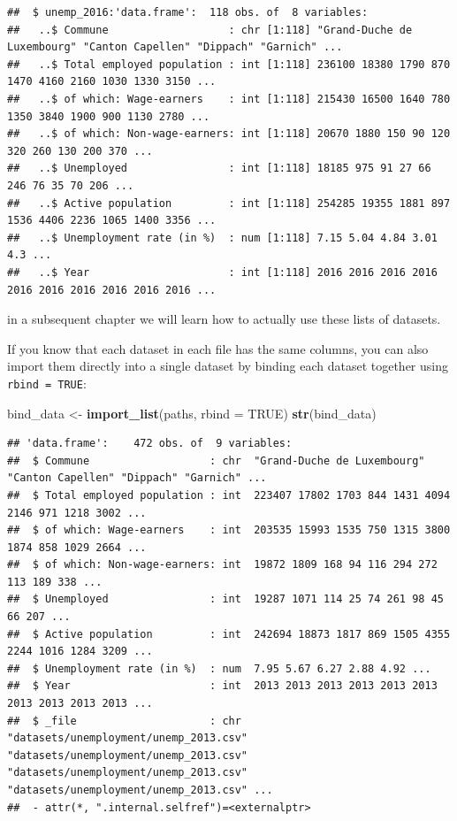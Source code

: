\documentclass[]{gitbook}
\newenvironment{Shaded}{\begin{snugshade}}{\end{snugshade}}
\newcommand{\DataTypeTok}[1]{\textcolor[rgb]{0.13,0.29,0.53}{#1}}
\newcommand{\KeywordTok}[1]{\textcolor[rgb]{0.13,0.29,0.53}{\textbf{#1}}}
\newcommand{\NormalTok}[1]{#1}
\newcommand{\OtherTok}[1]{\textcolor[rgb]{0.56,0.35,0.01}{#1}}
\newcommand{\StringTok}[1]{\textcolor[rgb]{0.31,0.60,0.02}{#1}}
\begin{document}
\begin{verbatim}
##  $ unemp_2016:'data.frame':  118 obs. of  8 variables:
##   ..$ Commune                   : chr [1:118] "Grand-Duche de Luxembourg" "Canton Capellen" "Dippach" "Garnich" ...
##   ..$ Total employed population : int [1:118] 236100 18380 1790 870 1470 4160 2160 1030 1330 3150 ...
##   ..$ of which: Wage-earners    : int [1:118] 215430 16500 1640 780 1350 3840 1900 900 1130 2780 ...
##   ..$ of which: Non-wage-earners: int [1:118] 20670 1880 150 90 120 320 260 130 200 370 ...
##   ..$ Unemployed                : int [1:118] 18185 975 91 27 66 246 76 35 70 206 ...
##   ..$ Active population         : int [1:118] 254285 19355 1881 897 1536 4406 2236 1065 1400 3356 ...
##   ..$ Unemployment rate (in %)  : num [1:118] 7.15 5.04 4.84 3.01 4.3 ...
##   ..$ Year                      : int [1:118] 2016 2016 2016 2016 2016 2016 2016 2016 2016 2016 ...
\end{verbatim}

in a subsequent chapter we will learn how to actually use these lists of datasets.

If you know that each dataset in each file has the same columns, you can also import them directly
into a single dataset by binding each dataset together using \texttt{rbind\ =\ TRUE}:

\begin{Shaded}
\begin{Highlighting}[]
\NormalTok{bind_data <-}\StringTok{ }\KeywordTok{import_list}\NormalTok{(paths, }\DataTypeTok{rbind =} \OtherTok{TRUE}\NormalTok{)}
\KeywordTok{str}\NormalTok{(bind_data)}
\end{Highlighting}
\end{Shaded}

\begin{verbatim}
## 'data.frame':    472 obs. of  9 variables:
##  $ Commune                   : chr  "Grand-Duche de Luxembourg" "Canton Capellen" "Dippach" "Garnich" ...
##  $ Total employed population : int  223407 17802 1703 844 1431 4094 2146 971 1218 3002 ...
##  $ of which: Wage-earners    : int  203535 15993 1535 750 1315 3800 1874 858 1029 2664 ...
##  $ of which: Non-wage-earners: int  19872 1809 168 94 116 294 272 113 189 338 ...
##  $ Unemployed                : int  19287 1071 114 25 74 261 98 45 66 207 ...
##  $ Active population         : int  242694 18873 1817 869 1505 4355 2244 1016 1284 3209 ...
##  $ Unemployment rate (in %)  : num  7.95 5.67 6.27 2.88 4.92 ...
##  $ Year                      : int  2013 2013 2013 2013 2013 2013 2013 2013 2013 2013 ...
##  $ _file                     : chr  "datasets/unemployment/unemp_2013.csv" "datasets/unemployment/unemp_2013.csv" "datasets/unemployment/unemp_2013.csv" "datasets/unemployment/unemp_2013.csv" ...
##  - attr(*, ".internal.selfref")=<externalptr>
\end{verbatim}
\end{document}
